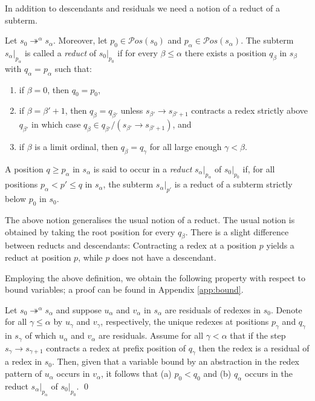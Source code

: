 \documentclass{LMCS}
\theoremstyle{plain}
\theoremstyle{definition}
\newcommand{\rew}{\rightarrow}
\newcommand{\trewt}{\twoheadrightarrow}
\newcommand{\pos}[1]{\mathcal{P}os(#1)}
\begin{document}
In addition to descendants and residuals we need a notion of a reduct of a subterm.
\begin{defi}
Let $s_0 \trewt^\alpha s_\alpha$. Moreover, let $p_0 \in \pos{s_0}$ and $p_\alpha \in \pos{s_\alpha}$. The subterm $s_{\alpha}|_{p_\alpha}$ is called a \emph{reduct} of $s_0|_{p_0}$ if for every $\beta \leq \alpha$ there exists a position $q_\beta$ in $s_\beta$ with $q_\alpha = p_\alpha$ such that:
\begin{enumerate}[$\bullet$]
\item
if $\beta = 0$, then $q_0 = p_0$,
\item
if $\beta = \beta' + 1$, then $q_\beta = q_{\beta'}$ unless $s_{\beta'} \rew s_{\beta' + 1}$ contracts a redex strictly above $q_{\beta'}$ in which case $q_\beta \in q_{\beta'} / (s_{\beta'} \rew s_{\beta' + 1})$, and
\item
if $\beta$ is a limit ordinal, then $q_\beta = q_\gamma$ for all large enough $\gamma < \beta$.
\end{enumerate}

A position $q \geq p_\alpha$ in $s_\alpha$ is said to occur in a \emph{reduct} $s_\alpha|_{p_\alpha}$ of $s_0|_{p_0}$ if, for all positions $p_\alpha < p' \leq q$
in $s_\alpha$, the subterm $s_\alpha\vert_{p'}$ is a reduct
of a subterm strictly below $p_0$ in $s_0$.
\end{defi}

The above notion generalises the usual notion of a reduct. The usual notion is obtained by taking the root position for every $q_\beta$. There is a slight difference between reducts and descendants: Contracting a redex at a position $p$ yields a reduct at position $p$, while $p$ does not have a descendant.

Employing the above definition, we obtain the following property with respect to bound variables; a proof can be found in Appendix \ref{app:bound}.

\begin{lem}
\label{lem:funky_bind}
Let $s_0 \trewt^\alpha s_\alpha$ and suppose $u_\alpha$ and $v_\alpha$ in $s_\alpha$ are residuals of redexes in $s_0$. Denote for all $\gamma \leq \alpha$  by $u_\gamma$ and $v_\gamma$, respectively, the unique redexes at positions $p_\gamma$ and $q_\gamma$ in $s_\gamma$ of which $u_\alpha$ and $v_\alpha$ are residuals.
Assume for all $\gamma < \alpha$ that if the step $s_\gamma \rew s_{\gamma + 1}$ contracts a redex at prefix position of $q_\gamma$ then the redex is a residual of a redex in $s_0$. Then, given that a variable bound by an abstraction in the redex pattern of $u_\alpha$ occurs in $v_\alpha$, it follows that (a) $p_0 < q_0$ and (b) $q_\alpha$ occurs in the reduct $s_\alpha|_{p_\alpha}$ of $s_0|_{p_0}$. \qed
\end{lem}
\end{document}
